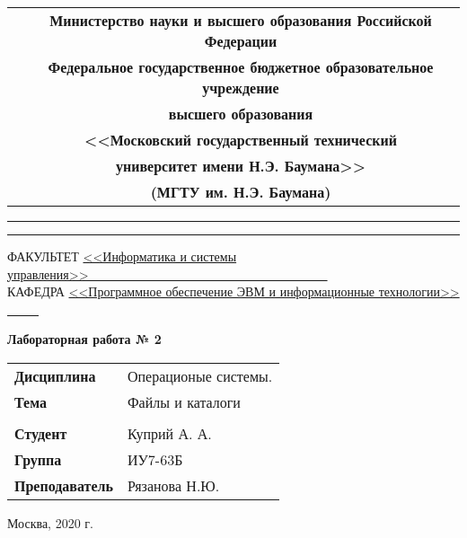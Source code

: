 \pagestyle{empty}
    \begin{table}[H]
        \centering
        \footnotesize
        \begin{tabular}{cc}
            & \textbf{Министерство науки и высшего образования Российской Федерации} \\
            & \textbf{Федеральное государственное бюджетное образовательное учреждение} \\
            & \textbf{высшего образования} \\
            & \textbf{<<Московский государственный технический} \\
            & \textbf{университет имени Н.Э. Баумана>>} \\
            & \textbf{(МГТУ им. Н.Э. Баумана)} \\
        \end{tabular}
    \end{table}

    \vspace{-2.5cm}

    \begin{flushleft}
        \rule[-1cm]{\textwidth}{3pt}
        \rule{\textwidth}{1pt}
    \end{flushleft}

    \begin{flushleft}
        \small
        ФАКУЛЬТЕТ
        \underline{<<Информатика и системы управления>>\ \ \ \ \ \ \ 
        \ \ \ \ \ \ \ \ \ \ \ \ \ \ \ \ \ \ \ \ \ \ \ \ \ \ \ \ \ \ \  } \\
        КАФЕДРА
        \underline{<<Программное обеспечение ЭВМ и
        информационные технологии>>
        \ \ \ \ \ }
    \end{flushleft}

    \vspace{1cm}

    \begin{center}
        \textbf{Лабораторная работа № 2} \\
        \vspace{0.5cm}
    \end{center}

    \vspace{4cm}

    \begin{flushleft}
        \begin{tabular}{ll}
            \textbf{Дисциплина} & Операционые системы. \\
            \textbf{Тема} & Файлы и каталоги \\
            \\
            \textbf{Студент} & Куприй А. А. \\
            \textbf{Группа} & ИУ7-63Б \\
            \textbf{Преподаватель} & Рязанова Н.Ю. \\
        \end{tabular}
    \end{flushleft}

    \vspace{6cm}

    \begin{center}
        Москва, 2020 г.
    \end{center}
